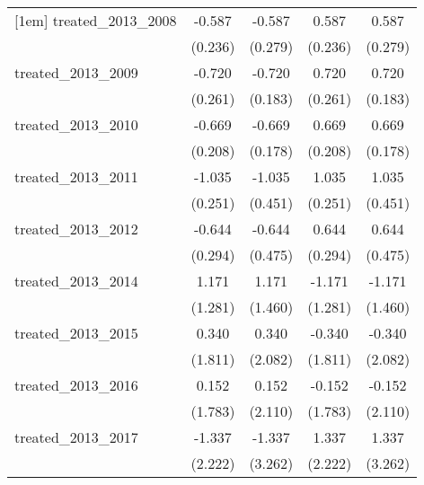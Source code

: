 {\begin{tabular}{l*{4}{c}}
[1em]
treated\_2013\_2008&      -0.587\sym{*}  &      -0.587\sym{*}  &       0.587\sym{*}  &       0.587\sym{*}  \\
            &     (0.236)         &     (0.279)         &     (0.236)         &     (0.279)         \\
[1em]
treated\_2013\_2009&      -0.720\sym{**} &      -0.720\sym{***}&       0.720\sym{**} &       0.720\sym{***}\\
            &     (0.261)         &     (0.183)         &     (0.261)         &     (0.183)         \\
[1em]
treated\_2013\_2010&      -0.669\sym{**} &      -0.669\sym{***}&       0.669\sym{**} &       0.669\sym{***}\\
            &     (0.208)         &     (0.178)         &     (0.208)         &     (0.178)         \\
[1em]
treated\_2013\_2011&      -1.035\sym{***}&      -1.035\sym{*}  &       1.035\sym{***}&       1.035\sym{*}  \\
            &     (0.251)         &     (0.451)         &     (0.251)         &     (0.451)         \\
[1em]
treated\_2013\_2012&      -0.644\sym{*}  &      -0.644         &       0.644\sym{*}  &       0.644         \\
            &     (0.294)         &     (0.475)         &     (0.294)         &     (0.475)         \\
[1em]
treated\_2013\_2014&       1.171         &       1.171         &      -1.171         &      -1.171         \\
            &     (1.281)         &     (1.460)         &     (1.281)         &     (1.460)         \\
[1em]
treated\_2013\_2015&       0.340         &       0.340         &      -0.340         &      -0.340         \\
            &     (1.811)         &     (2.082)         &     (1.811)         &     (2.082)         \\
[1em]
treated\_2013\_2016&       0.152         &       0.152         &      -0.152         &      -0.152         \\
            &     (1.783)         &     (2.110)         &     (1.783)         &     (2.110)         \\
[1em]
treated\_2013\_2017&      -1.337         &      -1.337         &       1.337         &       1.337         \\
            &     (2.222)         &     (3.262)         &     (2.222)         &     (3.262)         \\

\end{tabular}}
